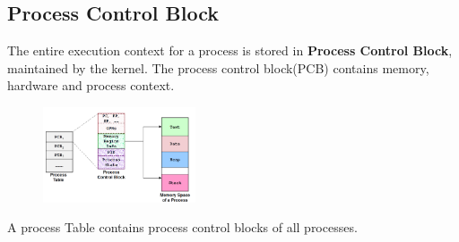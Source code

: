 \documentclass[12pt]{article}
\theoremstyle{definition}
\begin{document}
\subsection{Process Control Block}
The entire execution context for a process is stored in \textbf{Process Control Block}, maintained by the kernel. The process control block(PCB) contains memory, hardware and process context.\\
\begin{figure}[h]
\centering
\includegraphics[width=0.4\textwidth]{2_5.png}
\end{figure}
 A process Table contains process control blocks of all processes.
\end{document}
